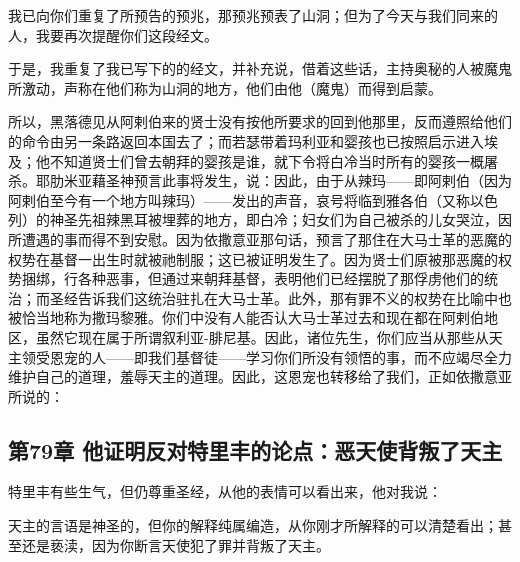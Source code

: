 我已向你们重复了所预告的预兆，那预兆预表了山洞；但为了今天与我们同来的人，我要再次提醒你们这段经文。\par

于是，我重复了我已写下的的经文，并补充说，借着这些话，主持奥秘的人被魔鬼所激动，声称在他们称为山洞的地方，他们由他（魔鬼）而得到启蒙。\par

所以，黑落德见从阿剌伯来的贤士没有按他所要求的回到他那里，反而遵照给他们的命令由另一条路返回本国去了；而若瑟带着玛利亚和婴孩也已按照启示进入埃及；他不知道贤士们曾去朝拜的婴孩是谁，就下令将白冷当时所有的婴孩一概屠杀。耶肋米亚藉圣神预言此事将发生，说：因此，由于从辣玛——即阿剌伯（因为阿剌伯至今有一个地方叫辣玛）——发出的声音，哀号将临到雅各伯（又称以色列）的神圣先祖辣黑耳被埋葬的地方，即白冷；妇女们为自己被杀的儿女哭泣，因所遭遇的事而得不到安慰。因为依撒意亚那句话，预言了那住在大马士革的恶魔的权势在基督一出生时就被祂制服；这已被证明发生了。因为贤士们原被那恶魔的权势捆绑，行各种恶事，但通过来朝拜基督，表明他们已经摆脱了那俘虏他们的统治；而圣经告诉我们这统治驻扎在大马士革。此外，那有罪不义的权势在比喻中也被恰当地称为撒玛黎雅。你们中没有人能否认大马士革过去和现在都在阿剌伯地区，虽然它现在属于所谓叙利亚-腓尼基。因此，诸位先生，你们应当从那些从天主领受恩宠的人——即我们基督徒——学习你们所没有领悟的事，而不应竭尽全力维护自己的道理，羞辱天主的道理。因此，这恩宠也转移给了我们，正如依撒意亚所说的：\par


\subsection{第79章 他证明反对特里丰的论点：恶天使背叛了天主}

特里丰有些生气，但仍尊重圣经，从他的表情可以看出来，他对我说：\par

天主的言语是神圣的，但你的解释纯属编造，从你刚才所解释的可以清楚看出；甚至还是亵渎，因为你断言天使犯了罪并背叛了天主。\par


